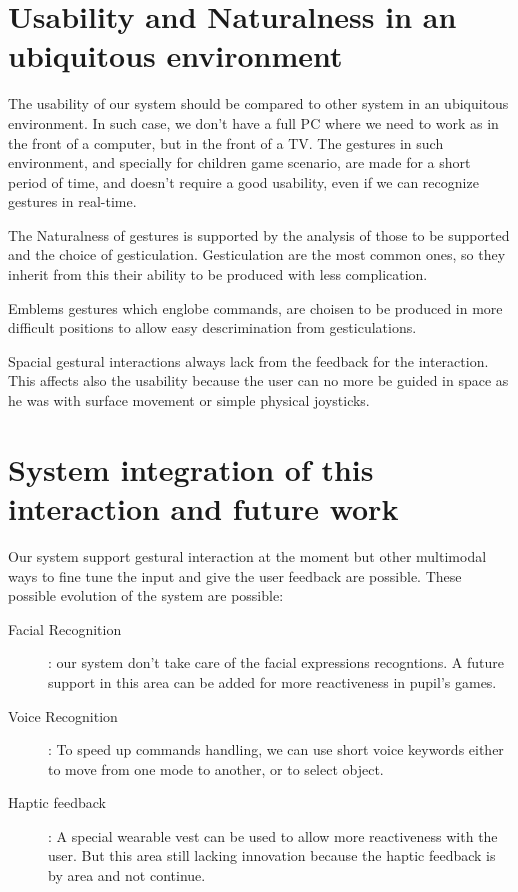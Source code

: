 \documentclass{llncs}
\newcommand\ignore[1]{}
\begin{document}
\section{Usability and Naturalness in an ubiquitous environment}

The usability of our system should be compared to other system in an ubiquitous
environment. In such case, we don't have a full PC where we need to work as in
the front of a computer, but in the front of a TV.
The gestures in such environment, and specially for children game scenario,
are made for a short period of time, and doesn't require a good usability,
even if we can recognize gestures in real-time.

The Naturalness of gestures is supported by the analysis of those to be
supported and the choice of gesticulation.
Gesticulation are the most common ones, so they inherit from this their
ability to be produced with less complication.

Emblems gestures which englobe commands, are choisen to be produced in more
difficult positions to allow easy descrimination from gesticulations.

Spacial gestural interactions always lack from the feedback for the interaction.
This affects also the usability because the user can no more be guided in space
as he was with surface movement or simple physical joysticks.

\section{System integration of this interaction and future work}

Our system support gestural interaction at the moment but other multimodal ways
to fine tune the input and give the user feedback are possible.
These possible evolution of the system are possible:

\begin{description}
 \item[Facial Recognition]: our system don't take care of the facial expressions
recogntions. A future support in this area can be added for more reactiveness in
pupil's games.
 \item[Voice Recognition]: To speed up commands handling, we can use short voice
keywords either to move from one mode to another, or to select object.
 \item[Haptic feedback]: A special wearable vest can be used to allow more
reactiveness with the user. But this area still lacking innovation because the
haptic feedback is by area and not continue.
\end{description}

\ignore{
Gesture + facial recog.
Voice recognition
Haptic 
--
Naturalness came from the analysis of gestures used in talk shows.
(gestures used many times means nature gestures)
Reverse thinking.
Usability in the context of RevTV ??
}


\end{document}
